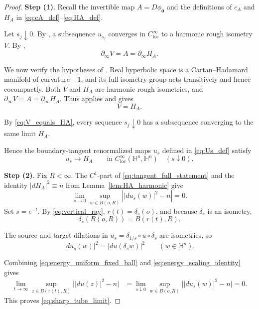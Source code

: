\documentclass[11pt]{amsart}
\theoremstyle{plain}
\theoremstyle{plain}
\theoremstyle{plain}
\newcommand{\Hn}{\mathbb H^n}
\newcommand{\bdry}{\partial_\infty}
\numberwithin{equation}{section}
\begin{document}
\begin{proof}
\textbf{Step (1)}. Recall the invertible map
\(A=D\phi_{\mathbf{0}}\) and the definitions of \(c_A\) and \(H_A\)
in \eqref{eq:cA_def}--\eqref{eq:HA_def}.

Let \(s_j\downarrow0\).  By , a subsequence $u_{s_j}$ converges in \(C^\infty_{\mathrm{loc}}\) to a harmonic rough isometry
\(V\).  By ,
\[
\bdry V=A=\bdry H_A.
\]

We now verify the hypotheses of .  Real
hyperbolic space is a Cartan--Hadamard manifold of curvature \(-1\), and
its full isometry group acts transitively and hence cocompactly.  Both
\(V\) and \(H_A\) are harmonic rough isometries, and
\(\bdry V=A=\bdry H_A\).  Thus  applies and
gives
\begin{equation}\label{eq:V_equals_HA}
V=H_A.
\end{equation}

By \eqref{eq:V_equals_HA}, every sequence \(s_j\downarrow0\)
has a subsequence converging to the same limit \(H_A\).

Hence the boundary-tangent renormalized maps \(u_s\) defined in
\eqref{eq:Us_def} satisfy
\begin{equation}\label{eq:tangent_full_statement}
u_s\longrightarrow H_A
\qquad\text{in }C^\infty_{\mathrm{loc}}(\Hn,\Hn)
\quad(s\downarrow0).
\end{equation}

\textbf{Step (2)}. Fix \(R<\infty\).  The \(C^1\)-part of
\eqref{eq:tangent_full_statement} and the identity \(|dH_A|^2\equiv n\) from Lemma~\ref{lem:HA_harmonic} give
\begin{equation}\label{eq:energy_uniform_fixed_ball}
\lim_{s\rightarrow 0}\sup_{w\in B(o,R)}
\left||du_s(w)|^2-n\right|= 0.
\end{equation}
Set \(s=e^{-t}\).  By \eqref{eq:vertical_ray},
\(r(t)=\delta_s(o)\), and because \(\delta_s\) is an isometry,
\[
\delta_s(B(o,R))=B(r(t),R).
\]

The source and target dilations in
\(u_s=\delta_{1/s}\circ u\circ\delta_s\) are isometries, so
\begin{equation}\label{eq:energy_scaling_identity}
|du_s(w)|^2=|du(\delta_sw)|^2
\qquad(w\in\Hn).
\end{equation}

Combining \eqref{eq:energy_uniform_fixed_ball} and
\eqref{eq:energy_scaling_identity} gives
\begin{align}
\lim_{t\to\infty}
\sup_{z\in B(r(t),R)}
\bigl||du(z)|^2-n\bigr|
&=
\lim_{s\downarrow0}
\sup_{w\in B(o,R)}
\bigl||du_s(w)|^2-n\bigr|=0.
\nonumber
\end{align}
This proves \eqref{eq:sharp_tube_limit}.  
\end{proof}
\end{document}
